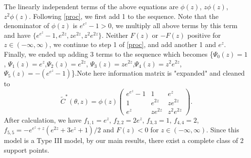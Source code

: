 \documentclass[11pt]{amsart}
\theoremstyle{definition}
\theoremstyle{remark}
\begin{document}
The linearly independent terms of the above equations are $\phi(z)$, $z\phi(z)$, $z^2\phi(z)$. Following \ref{proc}, we first add 1 to the sequence. Note that the denominator of $\phi(z)$ is $e^{e^z}-1>0$, we multiply all above terms by this term and have $\{e^{e^z}-1,e^{2z}, ze^{2z}, z^2e^{2z}\}$. Neither $ F(z)$ or $ -F(z)$ positive for $z\in (-\infty,\infty)$, we continue to step 1 of \ref{proc}, and add another 1 and $e^z$. Finally, we ended up adding 3 terms to the sequence which becomes \{$\Psi_0(z) = 1$, $\Psi_1(z) = e^z$,$\Psi_2(z) = e^{2z}$,  $\Psi_3(z) = ze^{2z}$,$\Psi_4(z) = z^2e^{2z}$, $\Psi_5(z) = -(e^{e^z}-1)$\}.Note here information matrix is "expanded" and cleaned to  \[ \tilde{C}^*(\theta,z) = \phi(z)\left(\begin{array}{ccc}
e^{e^z}-1&1&e^{z}\\
1&e^{2z} & ze^{2z}\\
e^z& ze^{2z} & z^2e^{2z}
\end{array} \right).\] After calculation, we have $f_{1,1} = e^z$, $f_{2,2} =2e^z$, $f_{3,3} = 1$, $f_{4,4} = 2$, $f_{5,5} =- e^{e^z+z}(e^{2z}+3e^z+1)/2$ and $F(z)<0$ for $z\in(-\infty,\infty)$. Since this model is a Type III model, by our main results, there exist a complete class of 2 support points. \\

\end{document}
